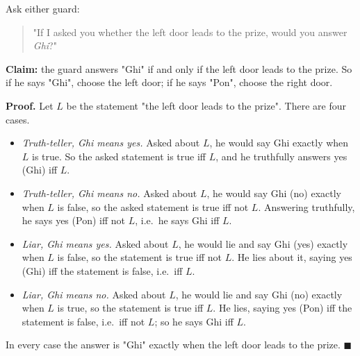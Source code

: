 Ask either guard:
\begin{quote}
"If I asked you whether the left door leads to the prize, would you answer \emph{Ghi}?"
\end{quote}
\textbf{Claim:} the guard answers "Ghi" if and only if the left door leads to the prize. So if he says "Ghi", choose the left door; if he says "Pon", choose the right door.

\textbf{Proof.} Let $L$ be the statement "the left door leads to the prize". There are four cases.
\begin{itemize}
\item \emph{Truth-teller, Ghi means yes.} Asked about $L$, he would say Ghi exactly when $L$ is true. So the asked statement is true iff $L$, and he truthfully answers yes (Ghi) iff $L$.
\item \emph{Truth-teller, Ghi means no.} Asked about $L$, he would say Ghi (no) exactly when $L$ is false, so the asked statement is true iff not $L$. Answering truthfully, he says yes (Pon) iff not $L$, i.e.\ he says Ghi iff $L$.
\item \emph{Liar, Ghi means yes.} Asked about $L$, he would lie and say Ghi (yes) exactly when $L$ is false, so the statement is true iff not $L$. He lies about it, saying yes (Ghi) iff the statement is false, i.e.\ iff $L$.
\item \emph{Liar, Ghi means no.} Asked about $L$, he would lie and say Ghi (no) exactly when $L$ is true, so the statement is true iff $L$. He lies, saying yes (Pon) iff the statement is false, i.e.\ iff not $L$; so he says Ghi iff $L$.
\end{itemize}
In every case the answer is "Ghi" exactly when the left door leads to the prize. $\blacksquare$
